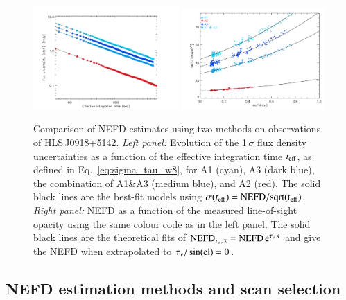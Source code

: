 \documentclass[traditionalabstract]{aa}
\newcommand{\hls}{HLS\,J0918+5142}
\newcommand{\elev}{\rm{el}}
\newcommand{\taunu}{\tau_{\nu}}
\begin{document}
{\begin{figure}[!thbp]
  \begin{center}
    \includegraphics[trim={0.5cm, 0, 0, 0.5cm}, clip, angle=0, width=0.495\textwidth]{Figures/hls_nefd_vst-eps-converted-to.pdf}
    \includegraphics[trim={0.5cm, 0, 0.2cm, 0.5cm}, clip, angle=0, width=0.485\textwidth]{Figures/hls_NEFD_vs_TauElev_all-eps-converted-to.pdf}
    \caption{Comparison of NEFD estimates using two methods on observations of
      \hls. \emph{Left panel:} Evolution of the 1\,$\sigma$ flux density
      uncertainties as a function of the effective integration time
      $t_{\rm{eff}}$, as defined in Eq.~\ref{eq:sigma_tau_w8}, for A1
    (cyan), A3 (dark blue), the combination of A1\&A3 (medium blue),
    and A2 (red). The solid black lines are the best-fit models using
    $\sigma(t_{\rm{eff}}) =  \rm{NEFD}/sqrt(t_{\rm{eff}})$. \emph{Right panel:} NEFD as a function of the
    measured line-of-sight opacity using the same colour code as in the
    left panel. The solid black lines are the theoretical
    fits of $\rm{NEFD}_{\taunu,\, x } = \rm{NEFD}\, e^{\taunu\,x}$ and give the
    NEFD when extrapolated to $\taunu/\sin(\elev)= 0$. }
    \label{fig:nefd_twomethods}
  \end{center}
\end{figure}

\subsection{NEFD estimation methods and scan selection}
\label{se:nefd_method}

}
\end{document}
